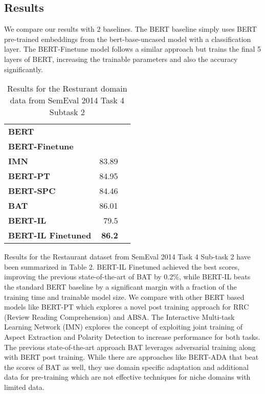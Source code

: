 \documentclass[11pt,a4paper]{article}
\begin{document}
\subsection{Results}

We compare our results with 2 baselines. The BERT baseline simply uses BERT pre-trained embeddings from the bert-base-uncased model with a classification layer. The BERT-Finetune model follows a similar approach but trains the final 5 layers of BERT, increasing the trainable parameters and also the accuracy significantly. 

\begin{table}[!htp]\centering
\scriptsize
\large
\begin{tabular}{lrr}\toprule
\textbf{BERT} & \\
\textbf{BERT-Finetune} & \\
\textbf{IMN} &83.89 \\
\textbf{BERT-PT} &84.95 \\
\textbf{BERT-SPC} &84.46 \\
\textbf{BAT} &86.01 \\
\textbf{BERT-IL} &79.5 \\
\textbf{BERT-IL Finetuned} &\textbf{86.2} \\
\bottomrule
\end{tabular}
\caption{Results for the Resturant domain data from SemEval 2014 Task 4 Subtask 2}\label{tab: }

\end{table}

Results for the Restaurant dataset from SemEval 2014 Task 4 Sub-task 2 have been summarized in Table 2. BERT-IL Finetuned achieved the best scores, improving the previous state-of-the-art of BAT by 0.2\%, while BERT-IL beats the standard BERT baseline by a significant margin with a fraction of the training time and trainable model size. We compare with other BERT based models like BERT-PT which explores a novel post training approach for RRC (Review Reading Comprehension) and ABSA. The Interactive Multi-task Learning Network (IMN) \cite{he2019interactive} explores the concept of exploiting joint training of Aspect Extraction and Polarity Detection to increase performance for both tasks. The previous state-of-the-art approach BAT leverages adversarial training along with BERT post training. While there are approaches like BERT-ADA \cite{rietzler2019adapt} that beat the scores of BAT as well, they use domain specific adaptation and additional data for pre-training which are not effective techniques for niche domains with limited data. 
\end{document}
